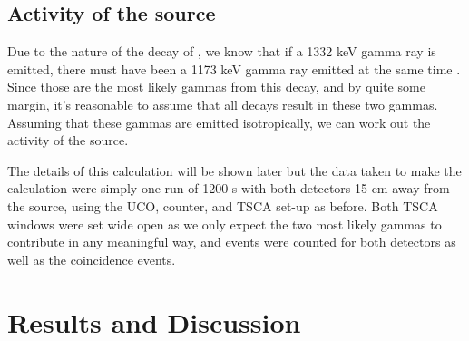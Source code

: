 \documentclass[11pt]{article}
\numberwithin{equation}{section}
\numberwithin{figure}{section}
\numberwithin{table}{section}
\begin{document}
\subsection{Activity of the  source}
\par Due to the nature of the decay of , we know that if a 1332 keV gamma ray is emitted, there must have been a 1173 keV gamma ray emitted at the same time \cite{60CoDecay}. Since those are the most likely gammas from this decay, and by quite some margin, it's reasonable to assume that all decays result in these two gammas. Assuming that these gammas are emitted isotropically, we can work out the activity of the  source. 
\par The details of this calculation will be shown later but the data taken to make the calculation were simply one run of 1200 s with both detectors 15 cm away from the source, using the UCO, counter, and TSCA set-up as before. Both TSCA windows were set wide open as we only expect the two most likely gammas to contribute in any meaningful way, and events were counted for both detectors as well as the coincidence events. 

\section{Results and Discussion}\label{sec:Results and Discussion}
\end{document}
